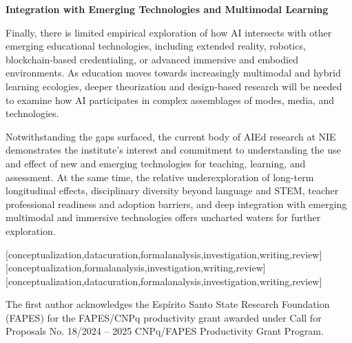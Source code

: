 \documentclass[english]{textolivre}
\begin{document}
\textbf{Integration with Emerging Technologies and Multimodal Learning}

    Finally, there is limited empirical exploration of how AI intersects with other emerging educational technologies, including extended reality, robotics, blockchain-based credentialing, or advanced immersive and embodied environments. As education moves towards increasingly multimodal and hybrid learning ecologies, deeper theorization and design-based research will be needed to examine how AI participates in complex assemblages of modes, media, and technologies.


Notwithstanding the gaps surfaced, the current body of AIEd research at NIE demonstrates the institute’s interest and commitment to understanding the use and effect of new and emerging technologies for teaching, learning, and assessment. At the same time, the relative underexploration of long-term longitudinal effects, disciplinary diversity beyond language and STEM, teacher professional readiness and adoption barriers, and deep integration with emerging multimodal and immersive technologies offers uncharted waters for further exploration.

\printbibliography\label{sec-bib}


\begin{contributors}
[conceptualization,datacuration,formalanalysis,investigation,writing,review]
[conceptualization,formalanalysis,investigation,writing,review]
[conceptualization,datacuration,formalanalysis,investigation,writing,review]
\end{contributors}



\begin{dataavailability}
\end{dataavailability}

\begin{funding}
The first author acknowledges the Espírito Santo State Research Foundation (FAPES) for the FAPES/CNPq productivity grant awarded under Call for Proposals No. 18/2024 – 2025 CNPq/FAPES Productivity Grant Program.
\end{funding}
\end{document}
